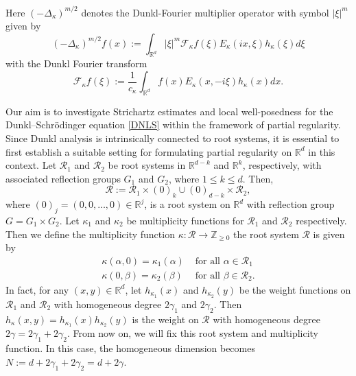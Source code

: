 \documentclass[a4paper,11pt, reqno]{amsart}
\theoremstyle{definition}
\theoremstyle{remark}
\numberwithin{equation}{section}
\begin{document}
    Here $(-\Delta_\kappa)^{m/2}$ denotes the Dunkl-Fourier multiplier operator with symbol $|\xi|^m$ given by 
    $$(-\Delta_\kappa)^{m/2} f(x):= \int_{\mathbb{R}^d}  |\xi|^m \mathcal{F}_\kappa{f}(\xi) E_\kappa (i x, \xi) h_\kappa(\xi) d\xi $$
    with the Dunkl Fourier transform  $$\mathcal{F}_\kappa{f}(\xi):= \frac{1}{c_{\kappa}}\int_{\mathbb{R}^d}  f(x) E_\kappa (x,-i \xi) h_\kappa(x)dx.$$

    
	Our aim is to investigate Strichartz estimates and local well-posedness for the Dunkl–Schr\"odinger equation \eqref{DNLS} within the framework of partial regularity. Since Dunkl analysis is intrinsically connected to root systems, it is essential to first establish a suitable setting for formulating partial regularity on $\mathbb{R}^d$ in this context.
       Let $\mathcal{R}_1$ and $\mathcal{R}_2$ be root systems in $\mathbb{R}^{d-k}$ and $\mathbb{R}^k$, respectively, with associated reflection groups $G_1$ and $G_2$, where $1 \leq k \leq d$.
  Then,
	$$
	\mathcal{R}:=\mathcal{R}_1 \times(0)_{k} \cup(0)_{d-k} \times \mathcal{R}_2 ,
	$$
	where $(0)_j=(0,0, \ldots, 0) \in \mathbb{R}^j$, is a root system on $\mathbb{R}^{d}$ with reflection group $G=G_1 \times G_2$. Let $\kappa_1 $ and $\kappa_2 $   be  multiplicity functions for $\mathcal{R}_1$ and   $\mathcal{R}_2$ respectively. Then we  define the multiplicity function $\kappa: \mathcal{R} \rightarrow \mathbb{Z}_{\geq 0}$ the root system $\mathcal{R}$ is given by $$
	\begin{array}{ll}
		\kappa(\alpha, 0)=\kappa_1(\alpha) & \text { for all } \alpha \in \mathcal{R}_1 \\
		\kappa(0, \beta)=\kappa_2(\beta) & \text { for all } \beta \in \mathcal{R}_2.
	\end{array}
	$$ In fact, for any $(x, y)\in \mathbb{R}^{d}$, let $h_{\kappa_1}(x)$ and $h_{\kappa_2}(y)$ be the
	weight functions on $\mathcal{R}_1$ and $\mathcal{R}_2$ with homogeneous degree $2\gamma_1$ and  $2\gamma_2$.  Then $h_{\kappa}(x, y)=h_{\kappa_1}(x) h_{\kappa_2}(y)$ is the weight on $\mathcal{R}$  with homogeneous degree $2\gamma=2\gamma_1+2\gamma_2$.  From now on, we will fix this root system and multiplicity function. In this case, the homogeneous dimension becomes $N:=d+2\gamma_1+2\gamma_2=d+2\gamma.$ 
	
	
	
\end{document}
